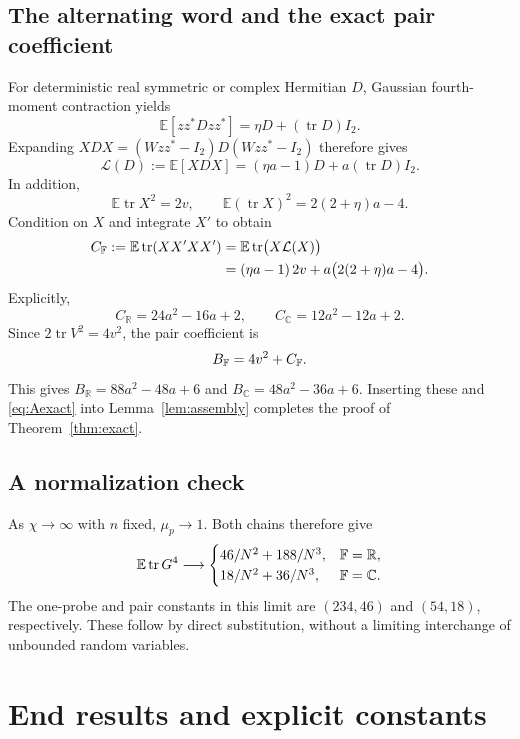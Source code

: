 \documentclass[11pt]{article}
\numberwithin{equation}{section}
\theoremstyle{definition}\newtheorem{definition}[theorem]{Definition}
\theoremstyle{remark}\newtheorem{remark}[theorem]{Remark}
\newcommand{\R}{\mathbb R}\newcommand{\E}{\mathbb E}\newcommand{\Prob}{\mathbb P}
\newcommand{\tr}{\operatorname{tr}}\newcommand{\Ent}{\operatorname{Ent}}
\newcommand{\C}{\mathbb C}
\begin{document}
\subsection{The alternating word and the exact pair coefficient}
For deterministic real symmetric or complex Hermitian $D$, Gaussian
fourth-moment contraction yields
\[
 \E[zz^*Dzz^*]=\eta D+(\tr D)I_2.
\]
Expanding $XDX=(Wzz^*-I_2)D(Wzz^*-I_2)$ therefore gives
\begin{equation}\label{eq:channel}
 \mathcal L(D):=\E[XDX]=(\eta a-1)D+a(\tr D)I_2.
\end{equation}
In addition,
\[
 \E\tr X^2=2v,\qquad \E(\tr X)^2=2(2+\eta)a-4.
\]
Condition on $X$ and integrate $X'$ to obtain
\begin{align}
 C_{\F}:=\E\tr(XX'XX')
 &=\E\tr\bigl(X\mathcal L(X)\bigr)\notag\\
 &=(\eta a-1)\,2v+a\bigl(2(2+\eta)a-4\bigr).\label{eq:Cexact}
\end{align}
Explicitly,
\[
 C_{\R}=24a^2-16a+2,\qquad C_{\C}=12a^2-12a+2.
\]
Since $2\tr V^2=4v^2$, the pair coefficient is
\[
 B_{\mathbb F}=4v^2+C_{\mathbb F}.
\]
This gives $B_{\R}=88a^2-48a+6$ and $B_{\C}=48a^2-36a+6$.
Inserting these and \eqref{eq:Aexact} into Lemma~\ref{lem:assembly} completes
the proof of Theorem~\ref{thm:exact}.

\subsection{A normalization check}
As $\chi\to\infty$ with $n$ fixed, $\mu_p\to1$. Both chains therefore give
\begin{equation}\label{eq:Gaussianlimit}
 \E\tr G^4\longrightarrow
 \begin{cases}
 46/N^2+188/N^3,&\F=\R,\\
 18/N^2+36/N^3,&\F=\C.
 \end{cases}
\end{equation}
The one-probe and pair constants in this limit are $(234,46)$ and $(54,18)$,
respectively. These follow by direct substitution, without a limiting
interchange of unbounded random variables.

\par{}
\section{End results and explicit constants}\label{sec:comparison}
\end{document}
